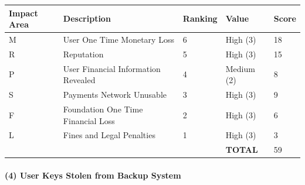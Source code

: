 \documentclass[12pt]{article} %
\begin{document}
{\begin{center}
\begin{tabular}{ | l | l | l | l | l |}
  \hline
  \textbf{Impact Area} & \textbf{Description} & \textbf{Ranking} & \textbf{Value} & \textbf{Score}
  \\ \hline
  M & User One Time Monetary Loss			& 6	& High (3)		& 18
  \\ \hline
  R & Reputation		& 5	& High (3)		& 15
  \\ \hline
  P & User Financial Information Revealed		& 4	& Medium (2)	& 8
  \\ \hline
  S & Payments Network Unusable					& 3	& High (3)		& 9
  \\ \hline
  F & Foundation One Time Financial Loss	& 2	& High (3)		& 6
  \\ \hline
  L & Fines and Legal Penalties						& 1	& High (3)		& 3
  \\ \hline
  & & & \textbf{TOTAL} & 59
  \\ \hline
\end{tabular}
\end{center}
\label{tab:severitySpoofIdToAddressLookup}

\paragraph{(4) User Keys Stolen from Backup System }

}
\end{document}
